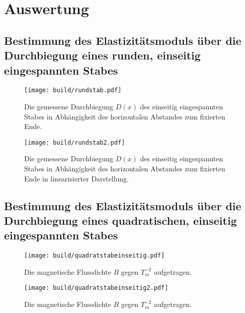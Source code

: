 
\section{Auswertung}
\label{sec:Auswertung}


\subsection{Bestimmung des Elastizitätsmoduls über die Durchbiegung eines runden, einseitig eingespannten Stabes}
\begin{figure}
	\centering
	\caption{Die gemessene Durchbiegung $D(x)$ des einseitig eingespannten Stabes
	 in Abhängigkeit des horizontalen Abstandes zum fixierten Ende.}
	\texttt{[image: build/rundstab.pdf]}
	\label{fig:grad3}
\end{figure}
\begin{figure}
	\centering
	\caption{Die gemessene Durchbiegung $D(x)$ des einseitig eingespannten Stabes
	 in Abhängigkeit des horizontalen Abstandes zum fixierten Ende in linearisierter Darstellung.}
	\texttt{[image: build/rundstab2.pdf]}
	\label{fig:grad3}
\end{figure}



\subsection{Bestimmung des Elastizitätsmoduls über die Durchbiegung eines quadratischen, einseitig eingespannten Stabes}
\begin{figure}
	\centering
	\caption{Die magnetische Flussdichte $B$ gegen $T_m ^{-2}$ aufgetragen.}
	\texttt{[image: build/quadratstabeinseitig.pdf]}
	\label{fig:grad3}
\end{figure}
\begin{figure}
	\centering
	\caption{Die magnetische Flussdichte $B$ gegen $T_m ^{-2}$ aufgetragen.}
	\texttt{[image: build/quadratstabeinseitig2.pdf]}
	\label{fig:grad3}
\end{figure}



